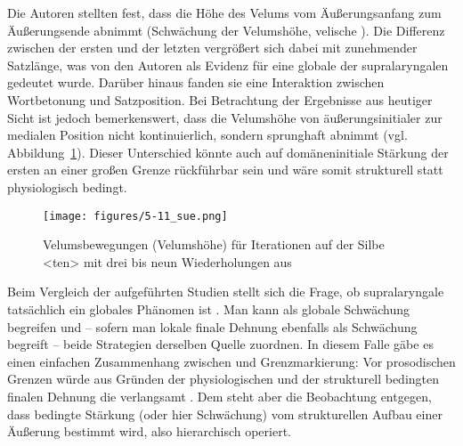 \begin{table}[hbtp]
	\caption{Zieläußerungen und Iterationen auf der Silbe <ten> nach \citet[][337]{Krakow1995}.}
	\label{table:0501}
\end{table}

Die Autoren stellten fest, dass die Höhe des Velums vom Äußerungsanfang zum Äußerungsende abnimmt (Schwächung der Velumshöhe, velische ). Die Differenz zwischen der ersten und der letzten  vergrößert sich dabei mit zunehmender Satzlänge, was von den Autoren als Evidenz für eine globale  der supralaryngalen  gedeutet wurde. Darüber hinaus fanden sie eine Interaktion zwischen Wortbetonung und Satzposition. Bei Betrachtung der Ergebnisse aus heutiger Sicht ist jedoch bemerkenswert, dass die Velumshöhe von äußerungsinitialer zur medialen Position nicht kontinuierlich, sondern sprunghaft abnimmt (vgl. Abbildung~\ref{figure:0511}). Dieser Unterschied könnte auch auf domäneninitiale Stärkung der ersten  an einer großen Grenze rückführbar sein und wäre somit strukturell statt physiologisch bedingt.

\begin{figure}[pthb]
	\texttt{[image: figures/5-11\_sue.png]}
	\caption{Velumsbewegungen (Velumshöhe) für Iterationen auf der Silbe <ten> mit drei bis neun Wiederholungen aus \citet[][343]{Krakow1995}}
	\label{figure:0511}
\end{figure}

Beim Vergleich der aufgeführten Studien stellt sich die Frage, ob supralaryngale  tatsächlich ein globales Phänomen ist \citep[vgl. die Diskussion in][]{Fougeron1997}. Man kann  als globale Schwächung begreifen und -- sofern man lokale finale Dehnung ebenfalls als Schwächung begreift -- beide Strategien derselben Quelle zuordnen. In diesem Falle gäbe es einen einfachen Zusammenhang zwischen  und Grenzmarkierung: Vor prosodischen Grenzen würde aus Gründen der physiologischen  und der strukturell bedingten finalen Dehnung die  verlangsamt \citep{Krakow1989}. Dem steht aber die Beobachtung entgegen, dass  bedingte Stärkung (oder hier Schwächung) vom strukturellen Aufbau einer Äußerung bestimmt wird, also hierarchisch operiert.

